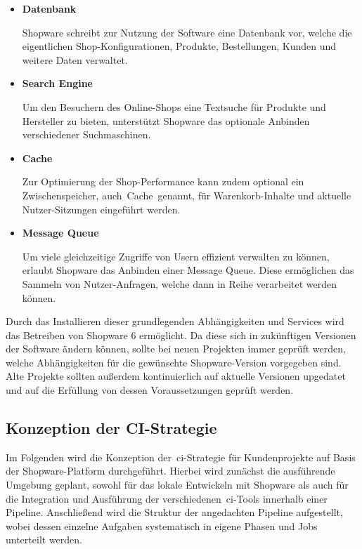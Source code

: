 \begin{itemize}
    \item {
        \textbf{Datenbank}\par
        Shopware schreibt zur Nutzung der Software eine Datenbank vor, welche die eigentlichen Shop-Konfigurationen,
        Produkte, Bestellungen, Kunden und weitere Daten verwaltet.
    }

    \item {
        \textbf{Search Engine}\par
        Um den Besuchern des Online-Shops eine Textsuche für Produkte und Hersteller zu bieten, unterstützt Shopware
        das optionale Anbinden verschiedener Suchmaschinen.
    }

    \item {
        \textbf{Cache}\par
        Zur Optimierung der Shop-Performance kann zudem optional ein Zwischenspeicher, auch\ \glqq Cache\grqq\ genannt,
        für Warenkorb-Inhalte und aktuelle Nutzer-Sitzungen eingeführt werden.
    }

    \item {
        \textbf{Message Queue}\par
        Um viele gleichzeitige Zugriffe von Usern effizient verwalten zu können, erlaubt Shopware das Anbinden einer
        Message Queue.
        Diese ermöglichen das Sammeln von Nutzer-Anfragen, welche dann in Reihe verarbeitet werden können.
    }
\end{itemize}

Durch das Installieren dieser grundlegenden Abhängigkeiten und Services wird das Betreiben von Shopware 6 ermöglicht.
Da diese sich in zukünftigen Versionen der Software ändern können, sollte bei neuen Projekten immer geprüft werden,
welche Abhängigkeiten für die gewünschte Shopware-Version vorgegeben sind.
Alte Projekte sollten außerdem kontinuierlich auf aktuelle Versionen upgedatet und auf die Erfüllung von dessen
Voraussetzungen geprüft werden.

\subsection{Konzeption der CI-Strategie} \label{subsec:03-concept-3}

Im Folgenden wird die Konzeption der\ \acrshort{ci}-Strategie für Kundenprojekte auf Basis der Shopware-Platform
durchgeführt.
Hierbei wird zunächst die ausführende Umgebung geplant, sowohl für das lokale Entwickeln mit Shopware als auch für die
Integration und Ausführung der verschiedenen\ \acrshort{ci}-Tools innerhalb einer Pipeline.
Anschließend wird die Struktur der angedachten Pipeline aufgestellt, wobei dessen einzelne Aufgaben systematisch in
eigene Phasen und Jobs unterteilt werden.


